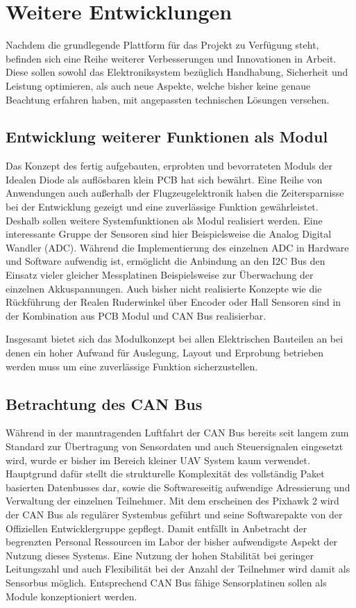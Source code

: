 \chapter{Weitere Entwicklungen}\label{cha:Weitere Entwicklungen}

Nachdem die grundlegende Plattform für das Projekt zu Verfügung steht, befinden sich eine Reihe weiterer Verbesserungen und Innovationen in Arbeit. Diese sollen sowohl das Elektroniksystem bezüglich Handhabung, Sicherheit und Leistung optimieren, als auch neue Aspekte, welche bisher keine genaue Beachtung erfahren haben, mit angepassten technischen Lösungen versehen.


\section{Entwicklung weiterer Funktionen als Modul}

Das Konzept des fertig aufgebauten, erprobten und bevorrateten Moduls der Idealen Diode als auflösbaren klein PCB hat sich bewährt. Eine Reihe von Anwendungen auch außerhalb der Flugzeugelektronik haben die Zeitersparnisse bei der Entwicklung gezeigt und eine zuverlässige Funktion gewährleistet.
Deshalb sollen weitere Systemfunktionen als Modul realisiert werden.
Eine interessante Gruppe der Sensoren sind hier Beispielsweise die Analog Digital Wandler (ADC). Während die Implementierung des einzelnen ADC in Hardware und Software aufwendig ist, ermöglicht die Anbindung an den I2C Bus den Einsatz vieler gleicher Messplatinen Beispielsweise zur Überwachung der einzelnen Akkuspannungen.
Auch bisher nicht realisierte Konzepte wie die Rückführung der Realen Ruderwinkel über Encoder oder Hall Sensoren sind in der Kombination aus PCB Modul und CAN Bus realisierbar.

Insgesamt bietet sich das Modulkonzept bei allen Elektrischen Bauteilen an bei denen ein hoher Aufwand für Auslegung, Layout und Erprobung betrieben werden muss um eine zuverlässige Funktion sicherzustellen.

\section{Betrachtung des CAN Bus}

Während in der manntragenden Luftfahrt der CAN Bus bereits seit langem zum Standard zur Übertragung von Sensordaten und auch Steuersignalen eingesetzt wird, wurde er bisher im Bereich kleiner UAV System kaum verwendet. Hauptgrund dafür stellt die strukturelle  Komplexität des vollständig Paket basierten Datenbusses dar, sowie die Softwareseitig aufwendige Adressierung und Verwaltung der einzelnen Teilnehmer.
Mit dem erscheinen des Pixhawk 2 wird der CAN Bus als regulärer Systembus geführt und seine Softwarepakte von der Offiziellen Entwicklergruppe gepflegt. Damit entfällt in Anbetracht der begrenzten Personal Ressourcen im Labor der bisher aufwendigste Aspekt der Nutzung dieses Systems. Eine Nutzung der hohen Stabilität bei geringer Leitungszahl und auch Flexibilität bei der Anzahl der Teilnehmer wird damit als Sensorbus möglich.
Entsprechend CAN Bus fähige Sensorplatinen sollen als Module konzeptioniert werden.

